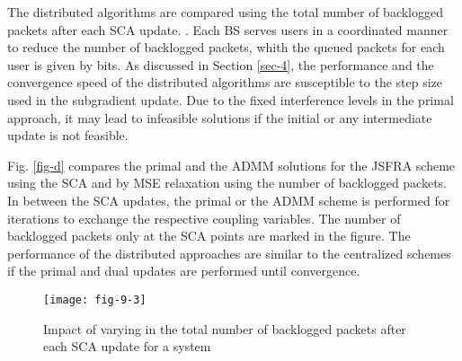 The distributed algorithms are compared using the total number of backlogged packets after each \ac{SCA} update. . Each \ac{BS} serves  users in a coordinated manner to reduce the number of backlogged packets, whith the queued packets for each user is given by  bits. As discussed in Section \ref{sec-4}, the performance and the convergence speed of the distributed algorithms are susceptible to the step size used in the subgradient update. Due to the fixed interference levels in the primal approach, it may lead to infeasible solutions if the initial or any intermediate update is not feasible.

Fig. \ref{fig-d} compares the primal and the \ac{ADMM} solutions for the \ac{JSFRA} scheme using the \ac{SCA} and by \ac{MSE} relaxation using the number of backlogged packets. In between the \ac{SCA} updates, the primal or the \ac{ADMM} scheme is performed for  iterations to exchange the respective coupling variables. The number of backlogged packets only at the \ac{SCA} points are marked in the figure. The performance of the distributed approaches are similar to the centralized schemes if the primal and dual updates are performed until convergence.
\begin{figure}
	\centering
	\texttt{[image: fig-9-3]}
	\caption{Impact of varying  in the total number of backlogged packets after each \ac{SCA} update for a system }
	\label{fig-d-3.1}
\end{figure}

